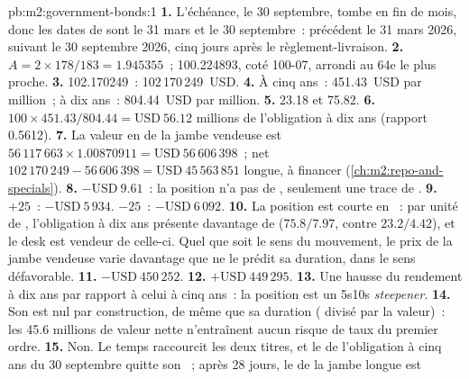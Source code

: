 \begin{solution}{pb:m2:government-bonds:1}
\textbf{1.} L'échéance, le 30 septembre, tombe en fin de mois, donc les dates de 
sont le 31 mars et le 30 septembre~: précédent le 31 mars 2026, suivant le 30 septembre 2026,
cinq jours après le règlement-livraison.
\textbf{2.} $A = 2 \times 178/183 = 1.945355$~;  100.224893, coté
100-07, arrondi au 64e le plus proche.
\textbf{3.}  102.170249~: 102\,170\,249~USD.
\textbf{4.} À cinq ans~: 451.43~USD par million~; à dix ans~: 804.44~USD par million.
\textbf{5.} 23.18 et 75.82.
\textbf{6.} $100 \times 451.43/804.44 = \text{USD}~56.12$ millions de l'obligation à dix ans
(rapport 0.5612).
\textbf{7.} La valeur en  de la jambe vendeuse est $56\,117\,663 \times 1.00870911 =
\text{USD}~56\,606\,398$~; net $102\,170\,249 - 56\,606\,398 = \text{USD}~45\,563\,851$
longue, à financer (\cref{ch:m2:repo-and-specials}).
\textbf{8.} $-\text{USD}~9.61$~: la position n'a pas de , seulement une trace de
.
\textbf{9.} $+25$~: $-\text{USD}~5\,934$. $-25$~: $-\text{USD}~6\,092$.
\textbf{10.} La position est courte en ~: par unité de , l'obligation à dix ans
présente davantage de  ($75.8/7.97$, contre $23.2/4.42$), et le desk est vendeur
de celle-ci. Quel que soit le sens du mouvement, le prix de la jambe vendeuse varie
davantage que ne le prédit sa duration, dans le sens défavorable.
\textbf{11.} $-\text{USD}~450\,252$.
\textbf{12.} $+\text{USD}~449\,295$.
\textbf{13.} Une hausse du rendement à dix ans par rapport à celui à cinq ans~: la
position est un 5s10s \emph{steepener}.
\textbf{14.} Son  est nul par construction, de même que sa duration (
divisé par la valeur)~: les 45.6 millions de valeur nette n'entraînent aucun
risque de taux du premier ordre.
\textbf{15.} Non. Le temps raccourcit les deux titres, et le  de l'obligation à cinq
ans du 30 septembre quitte son ~; après 28 jours, le  de la jambe longue est

\end{solution}
